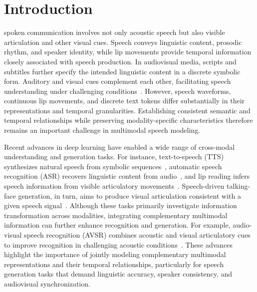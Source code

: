 \section{Introduction}
\label{sec:introduction}

 spoken communication involves not only acoustic speech but also visible articulation and other visual cues. Speech conveys linguistic content, prosodic rhythm, and speaker identity, while lip movements provide temporal information closely associated with speech production. In audiovisual media, scripts and subtitles further specify the intended linguistic content in a discrete symbolic form. Auditory and visual cues complement each other, facilitating speech understanding under challenging conditions~\cite{mcgurk1976hearing,drijvers2023multimodal}. However, speech waveforms, continuous lip movements, and discrete text tokens differ substantially in their representations and temporal granularities. Establishing consistent semantic and temporal relationships while preserving modality-specific characteristics therefore remains an important challenge in multimodal speech modeling.

Recent advances in deep learning have enabled a wide range of cross-modal understanding and generation tasks. For instance, text-to-speech (TTS) synthesizes natural speech from symbolic sequences~\cite{chen2025f5tts}, automatic speech recognition (ASR) recovers linguistic content from audio~\cite{radford2023whisper}, and lip reading infers speech information from visible articulatory movements~\cite{chung2017lipreading}. Speech-driven talking-face generation, in turn, aims to produce visual articulation consistent with a given speech signal~\cite{prajwal2020wav2lip}. Although these tasks primarily investigate information transformation across modalities, integrating complementary multimodal information can further enhance recognition and generation. For example, audio-visual speech recognition (AVSR) combines acoustic and visual articulatory cues to improve recognition in challenging acoustic conditions~\cite{ma2023autoavsr}. These advances highlight the importance of jointly modeling complementary multimodal representations and their temporal relationships, particularly for speech generation tasks that demand linguistic accuracy, speaker consistency, and audiovisual synchronization.

